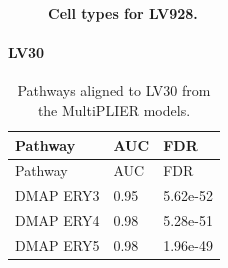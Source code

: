 \documentclass[
  a4paper,
]{article}
\newenvironment{fignos:tagged-figure}[1][]{
  \let\oldfigurename\figurename
  \renewcommand{\figurename}{Supplementary Figure}
}{
  \let\figurename\oldfigurename
}
\newenvironment{tablenos:tagged-table}[1][]{
  \let\oldtablename\tablename
  \renewcommand{\tablename}{Supplementary Table}
}{
  \let\tablename\oldtablename
}
\begin{document}
\begin{fignos:tagged-figure}[S17]

\begin{figure}
\hypertarget{fig:sup:lv928}{%
\centering

\caption{\textbf{Cell types for LV928.}
}\label{fig:sup:lv928}
}
\end{figure}

\end{fignos:tagged-figure}

\clearpage

\hypertarget{lv30}{%
\paragraph{LV30}\label{lv30}}

\begin{tablenos:tagged-table}[S15]

\begin{longtable}[]{@{}lll@{}}
\caption{Pathways aligned to LV30 from the MultiPLIER models.
\label{tbl:sup:multiplier_pathways:lv30}}\label{tbl:sup:multiplier_pathways:lv30}\tabularnewline
\toprule()
Pathway & AUC & FDR \\
\midrule()
\endfirsthead
\toprule()
Pathway & AUC & FDR \\
\midrule()
\endhead
DMAP ERY3 & 0.95 & 5.62e-52 \\
DMAP ERY4 & 0.98 & 5.28e-51 \\
DMAP ERY5 & 0.98 & 1.96e-49 \\
\bottomrule()
\end{longtable}

\end{tablenos:tagged-table}
\end{document}
